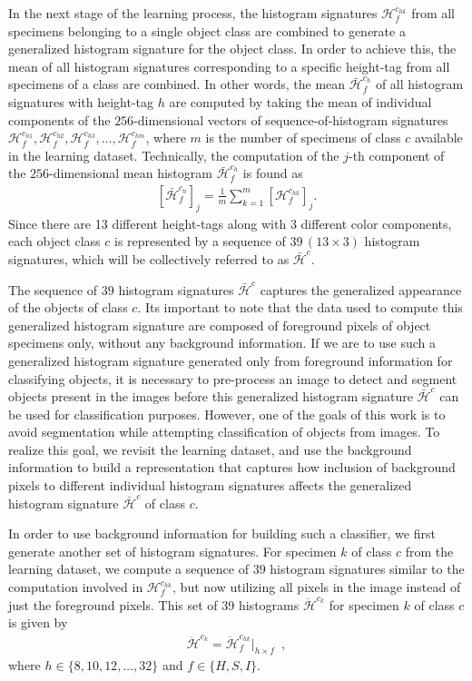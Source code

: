 In the next stage of the learning process, the histogram signatures $\mathcal{H}^{c_{hk}}_f$ from all specimens belonging to a single object class are combined to generate a generalized histogram signature for the object class.
In order to achieve this, the mean of all histogram signatures corresponding to a specific height-tag from all specimens of a class are combined. In other words, the mean $\bar{\mathcal{H}}^{c_{h}}_f$ of all histogram signatures with  height-tag $h$ are computed by taking the mean of individual components of the $256$-dimensional vectors of sequence-of-histogram signatures $\mathcal{H}^{c_{h1}}_f, \mathcal{H}^{c_{h2}}_f, \mathcal{H}^{c_{h3}}_f, \ldots, \mathcal{H}^{c_{hm}}_f$, where $m$ is the number of specimens of class $c$ available in the learning dataset. Technically, the computation of the $j$-th component of the $256$-dimensional mean histogram $\bar{\mathcal{H}}^{c_{h}}_f$ is found as
\begin{align}
 \left[\bar{\mathcal{H}}^{c_{h}}_f\right]_j=\frac{1}{m}\sum_{k=1}^{m} \left[ \mathcal{H}^{c_{hk}}_f \right]_j.
\end{align}
Since there are 13 different height-tags along with 3 different color components, each object class $c$ is represented by a sequence of $39\, (13 \times 3)$ histogram signatures, which will be collectively referred to as $\bar{\mathcal{H}}^{c}$.

The sequence of $39$ histogram signatures $\bar{\mathcal{H}}^{c}$ captures the generalized appearance of the objects of class $c$. Its important to note that the data used to compute this generalized histogram signature are composed of foreground pixels of object specimens only, without any background information. If we are to use such a generalized histogram signature generated only from foreground information for classifying objects, it is necessary to pre-process an image to detect and segment objects present in the images before this generalized histogram signature $\bar{\mathcal{H}}^{c}$ can be used for classification purposes. However, one of the goals of this work is to avoid segmentation while attempting classification of objects from images. To realize this goal, we revisit the learning dataset, and use the background information to build a representation that captures how inclusion of background pixels to different individual histogram signatures affects the generalized histogram signature $\bar{
\mathcal{H}}^{c}$ of class $c$. 

In order to use background information for building such a classifier, we first generate another set of histogram signatures.
For specimen $k$ of class $c$ from the learning dataset, we compute a sequence of $39$ histogram signatures similar to the computation involved in $\mathcal{H}^{c_{hk}}_f$, but now utilizing all pixels in the image instead of just the foreground pixels. This set of 39 histograms $\ddot{\mathcal{H}}^{c_{k}}$ for specimen $k$ of class $c$ is given by
\begin{align}	\label{eqn:hist_signature}
 \ddot{\mathcal{H}}^{c_{k}} = \ddot{\mathcal{H}}^{c_{hk}}_f \Big|_{h\times f}\enspace ,
\end{align}
%
where $h\in\{8,10,12, \ldots,32\}$ and $f\in\{H,S,I\}$.


